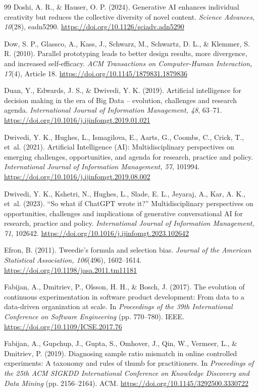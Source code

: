 \documentclass[preprint,12pt,authoryear]{elsarticle}
\providecommand{\doi}[1]{\url{https://doi.org/#1}}
\theoremstyle{definition}
\begin{document}
\begin{thebibliography}{99}
 Doshi, A. R., \& Hauser, O. P. (2024). Generative AI enhances individual creativity but reduces the collective diversity of novel content. \textit{Science Advances, 10}(28), eadn5290. \doi{10.1126/sciadv.adn5290}

 Dow, S. P., Glassco, A., Kass, J., Schwarz, M., Schwartz, D. L., \& Klemmer, S. R. (2010). Parallel prototyping leads to better design results, more divergence, and increased self-efficacy. \textit{ACM Transactions on Computer-Human Interaction, 17}(4), Article 18. \doi{10.1145/1879831.1879836}

 Duan, Y., Edwards, J. S., \& Dwivedi, Y. K. (2019). Artificial intelligence for decision making in the era of Big Data -- evolution, challenges and research agenda. \textit{International Journal of Information Management, 48}, 63--71. \doi{10.1016/j.ijinfomgt.2019.01.021}

 Dwivedi, Y. K., Hughes, L., Ismagilova, E., Aarts, G., Coombs, C., Crick, T., et~al. (2021). Artificial Intelligence (AI): Multidisciplinary perspectives on emerging challenges, opportunities, and agenda for research, practice and policy. \textit{International Journal of Information Management, 57}, 101994. \doi{10.1016/j.ijinfomgt.2019.08.002}

 Dwivedi, Y. K., Kshetri, N., Hughes, L., Slade, E. L., Jeyaraj, A., Kar, A. K., et~al. (2023). ``So what if ChatGPT wrote it?'' Multidisciplinary perspectives on opportunities, challenges and implications of generative conversational AI for research, practice and policy. \textit{International Journal of Information Management, 71}, 102642. \doi{10.1016/j.ijinfomgt.2023.102642}

 Efron, B. (2011). Tweedie's formula and selection bias. \textit{Journal of the American Statistical Association, 106}(496), 1602--1614. \doi{10.1198/jasa.2011.tm11181}

 Fabijan, A., Dmitriev, P., Olsson, H. H., \& Bosch, J. (2017). The evolution of continuous experimentation in software product development: From data to a data-driven organization at scale. In \textit{Proceedings of the 39th International Conference on Software Engineering} (pp. 770--780). IEEE. \doi{10.1109/ICSE.2017.76}

 Fabijan, A., Gupchup, J., Gupta, S., Omhover, J., Qin, W., Vermeer, L., \& Dmitriev, P. (2019). Diagnosing sample ratio mismatch in online controlled experiments: A taxonomy and rules of thumb for practitioners. In \textit{Proceedings of the 25th ACM SIGKDD International Conference on Knowledge Discovery and Data Mining} (pp. 2156--2164). ACM. \doi{10.1145/3292500.3330722}


\end{thebibliography}
\end{document}

